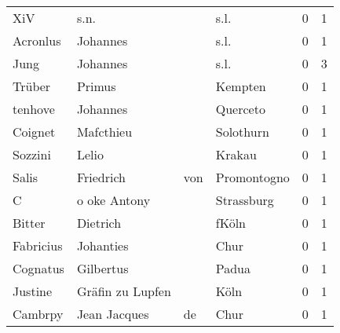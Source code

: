 \begin{tabular}{llllrr}
                      XiV &                               s.n. &             &                                        s.l. &          0 &         1 \\
                 Acronlus &                           Johannes &             &                                        s.l. &          0 &         1 \\
                     Jung &                           Johannes &             &                                        s.l. &          0 &         3 \\
                   Trüber &                             Primus &             &                                     Kempten &          0 &         1 \\
                  tenhove &                           Johannes &             &                                    Querceto &          0 &         1 \\
                  Coignet &                          Mafcthieu &             &                                   Solothurn &          0 &         1 \\
                  Sozzini &                              Lelio &             &                                      Krakau &          0 &         1 \\
                    Salis &                          Friedrich &         von &                                 Promontogno &          0 &         1 \\
                        C &                       o oke Antony &             &                                  Strassburg &          0 &         1 \\
                   Bitter &                           Dietrich &             &                                       fKöln &          0 &         1 \\
                Fabricius &                          Johanties &             &                                        Chur &          0 &         1 \\
                 Cognatus &                          Gilbertus &             &                                       Padua &          0 &         1 \\
                  Justine &                   Gräfin zu Lupfen &             &                                        Köln &          0 &         1 \\
                  Cambrpy &                       Jean Jacques &          de &                                        Chur &          0 &         1 \\

\end{tabular}
